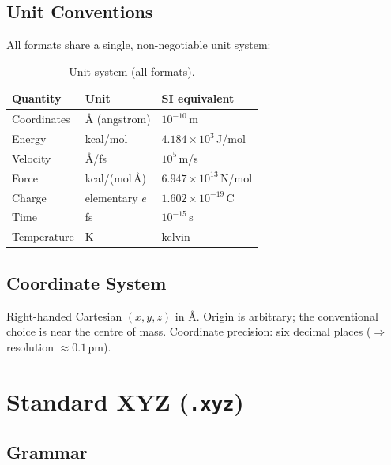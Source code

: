 \documentclass[12pt, a4paper, oneside]{article}
\begin{document}
\subsection{Unit Conventions}

All formats share a single, non-negotiable unit system:

\begin{table}[htbp]
  \centering
  \caption{Unit system (all formats).}
  \label{tab:units}
  \begin{tabular}{lll}
    \toprule
    Quantity & Unit & SI equivalent \\
    \midrule
    Coordinates   & \AA{} (angstrom) & $10^{-10}$\,m \\
    Energy        & kcal/mol         & $4.184 \times 10^{3}$\,J/mol \\
    Velocity      & \AA/fs           & $10^{5}$\,m/s \\
    Force         & kcal/(mol\,\AA)  & $6.947 \times 10^{13}$\,N/mol \\
    Charge        & elementary $e$   & $1.602 \times 10^{-19}$\,C \\
    Time          & fs               & $10^{-15}$\,s \\
    Temperature   & K                & kelvin \\
    \bottomrule
  \end{tabular}
\end{table}

\subsection{Coordinate System}

Right-handed Cartesian $(x, y, z)$ in \AA.  Origin is arbitrary;
the conventional choice is near the centre of mass.  Coordinate
precision: six decimal places ($\Rightarrow$ resolution $\approx
0.1$\,pm).

\section{Standard XYZ (\texttt{.xyz})}
\label{sec:xyz}

\subsection{Grammar}
\end{document}
